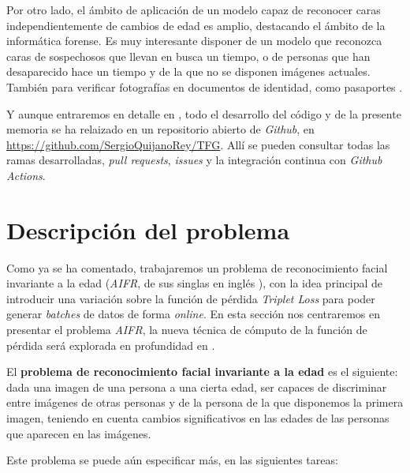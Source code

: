 Por otro lado, el ámbito de aplicación de un modelo capaz de reconocer caras independientemente de cambios de edad es amplio, destacando el ámbito de la informática forense. Es muy interesante disponer de un modelo que reconozca caras de sospechosos que llevan en busca un tiempo, o de personas que han desaparecido hace un tiempo y de la que no se disponen imágenes actuales. También para verificar fotografías en documentos de identidad, como pasaportes \cite{informatica:tecnica_sintesis_aifr}.

Y aunque entraremos en detalle en , todo el desarrollo del código y de la presente memoria se ha relaizado en un repositorio abierto de \textit{Github}, en \url{https://github.com/SergioQuijanoRey/TFG}. Allí se pueden consultar todas las ramas desarrolladas, \textit{pull requests}, \textit{issues} y la integración continua con \textit{Github Actions}.

\section{Descripción del problema} \label{ich:descrp_problema}

Como ya se ha comentado, trabajaremos un problema de reconocimiento facial invariante a la edad (\textit{AIFR}, de sus singlas en inglés ), con la idea principal de introducir una variación sobre la función de pérdida \textit{Triplet Loss} para poder generar \textit{batches} de datos de forma \textit{online}. En esta sección nos centraremos en presentar el problema \textit{AIFR}, la nueva técnica de cómputo de la función de pérdida será explorada en profundidad en .

El \textbf{problema de reconocimiento facial invariante a la edad} es el siguiente: dada una imagen de una persona a una cierta edad, ser capaces de discriminar entre imágenes de otras personas y de la persona de la que disponemos la primera imagen, teniendo en cuenta cambios significativos en las edades de las personas que aparecen en las imágenes.

Este problema se puede aún especificar más, en las siguientes tareas:

